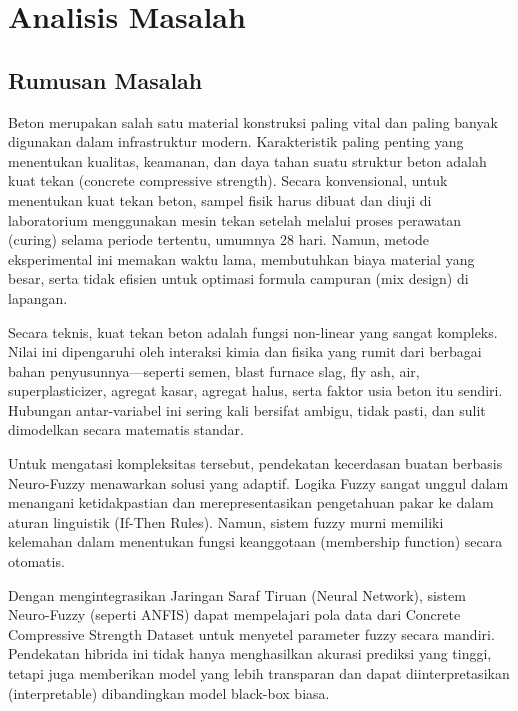 \section{Analisis Masalah}
\subsection{Rumusan Masalah}
Beton merupakan salah satu material konstruksi paling vital dan paling banyak digunakan dalam infrastruktur modern. 
Karakteristik paling penting yang menentukan kualitas, keamanan, dan daya tahan suatu struktur beton adalah kuat tekan (concrete compressive strength). 
Secara konvensional, untuk menentukan kuat tekan beton, sampel fisik harus dibuat dan diuji di laboratorium menggunakan mesin tekan setelah melalui proses perawatan (curing) selama periode tertentu, umumnya 28 hari. 
Namun, metode eksperimental ini memakan waktu lama, membutuhkan biaya material yang besar, serta tidak efisien untuk optimasi formula campuran (mix design) di lapangan.

Secara teknis, kuat tekan beton adalah fungsi non-linear yang sangat kompleks. 
Nilai ini dipengaruhi oleh interaksi kimia dan fisika yang rumit dari berbagai bahan penyusunnya—seperti semen, blast furnace slag, fly ash, air, superplasticizer, agregat kasar, agregat halus, serta faktor usia beton itu sendiri. 
Hubungan antar-variabel ini sering kali bersifat ambigu, tidak pasti, dan sulit dimodelkan secara matematis standar.

Untuk mengatasi kompleksitas tersebut, pendekatan kecerdasan buatan berbasis Neuro-Fuzzy menawarkan solusi yang adaptif. Logika Fuzzy sangat unggul dalam menangani ketidakpastian dan merepresentasikan pengetahuan pakar ke dalam aturan linguistik (If-Then Rules). 
Namun, sistem fuzzy murni memiliki kelemahan dalam menentukan fungsi keanggotaan (membership function) secara otomatis. 

Dengan mengintegrasikan Jaringan Saraf Tiruan (Neural Network), sistem Neuro-Fuzzy (seperti ANFIS) dapat mempelajari pola data dari Concrete Compressive Strength Dataset untuk menyetel parameter fuzzy secara mandiri. 
Pendekatan hibrida ini tidak hanya menghasilkan akurasi prediksi yang tinggi, tetapi juga memberikan model yang lebih transparan dan dapat diinterpretasikan (interpretable) dibandingkan model black-box biasa.
